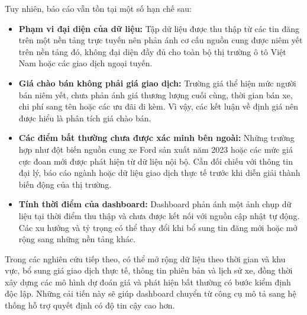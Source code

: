 Tuy nhiên, báo cáo vẫn tồn tại một số hạn chế sau:
\begin{itemize}
    \item \textbf{Phạm vi đại diện của dữ liệu:} Tập dữ liệu được thu thập từ các tin đăng trên một nền tảng trực tuyến nên phản ánh cơ cấu nguồn cung được niêm yết trên nền tảng đó, không đại diện đầy đủ cho toàn bộ thị trường ô tô Việt Nam hoặc các giao dịch ngoại tuyến.
    \item \textbf{Giá chào bán không phải giá giao dịch:} Trường giá thể hiện mức người bán niêm yết, chưa phản ánh giá thương lượng cuối cùng, thời gian bán xe, chi phí sang tên hoặc các ưu đãi đi kèm. Vì vậy, các kết luận về định giá nên được hiểu là phân tích giá chào bán.
    \item \textbf{Các điểm bất thường chưa được xác minh bên ngoài:} Những trường hợp như đột biến nguồn cung xe Ford sản xuất năm 2023 hoặc các mức giá cực đoan mới được phát hiện từ dữ liệu nội bộ. Cần đối chiếu với thông tin đại lý, báo cáo ngành hoặc dữ liệu giao dịch thực tế trước khi diễn giải thành biến động của thị trường.
    \item \textbf{Tính thời điểm của dashboard:} Dashboard phản ánh một ảnh chụp dữ liệu tại thời điểm thu thập và chưa được kết nối với nguồn cập nhật tự động. Các xu hướng và tỷ trọng có thể thay đổi khi bổ sung tin đăng mới hoặc mở rộng sang những nền tảng khác.
\end{itemize}

Trong các nghiên cứu tiếp theo, có thể mở rộng dữ liệu theo thời gian và khu vực, bổ sung giá giao dịch thực tế, thông tin phiên bản và lịch sử xe, đồng thời xây dựng các mô hình dự đoán giá và phát hiện bất thường có bước kiểm định độc lập. Những cải tiến này sẽ giúp dashboard chuyển từ công cụ mô tả sang hệ thống hỗ trợ quyết định có độ tin cậy cao hơn.



\clearpage